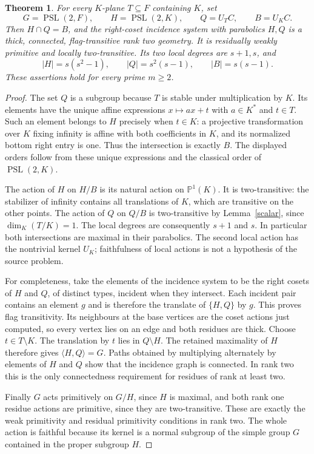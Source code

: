 \documentclass[11pt]{article}
\newtheorem{theorem}{Theorem}
\newcommand{\PS}{\operatorname{PSL}}
\begin{document}
\begin{theorem}\label{main}
For every $K$-plane $T\subseteq F$ containing $K$, set
\[
 G=\PS(2,F),\qquad H=\PS(2,K),\qquad Q=U_T C,\qquad B=U_K C.
\]
Then $H\cap Q=B$, and the right-coset incidence system with parabolics
$H,Q$ is a thick, connected, flag-transitive rank two geometry. It is
residually weakly primitive and locally two-transitive. Its two local
degrees are $s+1,s$, and
\[
 |H|=s(s^2-1),\qquad |Q|=s^2(s-1),\qquad |B|=s(s-1).
\]
These assertions hold for every prime $m\geq2$.
\end{theorem}
\begin{proof}
The set $Q$ is a subgroup because $T$ is stable under multiplication by
$K$. Its elements have the unique affine expressions $x\mapsto ax+t$
with $a\in K^*$ and $t\in T$. Such an element belongs to $H$ precisely
when $t\in K$: a projective transformation over $K$ fixing infinity is
affine with both coefficients in $K$, and its normalized bottom right
entry is one. Thus the intersection is exactly $B$. The displayed
orders follow from these unique expressions and the classical order of
$\PS(2,K)$.

The action of $H$ on $H/B$ is its natural action on $\mathbb P^1(K)$.
It is two-transitive: the stabilizer of infinity contains all translations
of $K$, which are transitive on the other points. The action of $Q$ on
$Q/B$ is two-transitive by Lemma~\ref{scalar}, since $\dim_K(T/K)=1$.
The local degrees are consequently $s+1$ and $s$. In particular both
intersections are maximal in their parabolics. The second local action
has the nontrivial kernel $U_K$; faithfulness of local actions is not a
hypothesis of the source problem.

For completeness, take the elements of the incidence system to be the
right cosets of $H$ and $Q$, of distinct types, incident when they
intersect. Each incident pair contains an element $g$ and is therefore
the translate of $\{H,Q\}$ by $g$. This proves flag transitivity.
Its neighbours at the base vertices are the coset actions just computed,
so every vertex lies on an edge and both residues are thick.
Choose $t\in T\setminus K$. The translation by $t$ lies in $Q\setminus H$.
The retained maximality of $H$ therefore gives $\langle H,Q\rangle=G$.
Paths obtained by multiplying alternately by elements of $H$ and $Q$
show that the incidence graph is connected. In rank two this is the only
connectedness requirement for residues of rank at least two.

Finally $G$ acts primitively on $G/H$, since $H$ is maximal, and both
rank one residue actions are primitive, since they are two-transitive.
These are exactly the weak primitivity and residual primitivity
conditions in rank two. The whole action is faithful because its kernel
is a normal subgroup of the simple group $G$ contained in the proper
subgroup $H$.
\end{proof}
\end{document}
